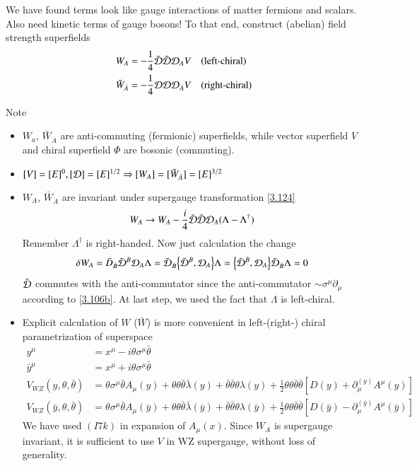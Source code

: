 We have found terms look like gauge interactions of matter fermions and scalars. Also need kinetic terms of gauge bosons! To that end, construct (abelian) field strength superfields
\begin{subequations}
\begin{align}
   W_A &= -\frac{1}{4} \bar{\mathcal{D}} \bar{\mathcal{D}} \mathcal{D}_A V \quad (\text{left-chiral}) \label{3.130a} \\
   \bar W_{\dot{A}} &= - \frac{1}{4} \mathcal{D} \mathcal{D} \mathcal{D}_{\dot{A}} V \quad (\text{right-chiral}) \label{3.130b}
\end{align}
\end{subequations}

Note 
\begin{itemize}
   \item $W_a$, $\bar W_{\dot{A}}$ are anti-commuting (fermionic) superfields, while vector superfield $V$ and chiral superfield $\Phi$ are bosonic (commuting).
   \item $[V] = [E]^0, [\mathcal{D}] = [E]^{1/2} \Rightarrow [W_A] = [\bar W_{\dot{A}}] = [E]^{3/2}$
   \item $W_A$, $\bar W_{\dot{A}}$ are invariant under supergauge transformation \eqref{3.124}
\begin{equation*}
   W_A \rightarrow W_A - \frac{i}{4} \bar{\mathcal{D}} \bar{\mathcal{D}} \mathcal{D}_A (\Lambda - \Lambda^\dagger)
\end{equation*}
Remember $\Lambda^\dagger$ is right-handed. Now just calculation the change
\begin{equation*}
   \delta W_A = \bar D_{\dot{B}} \bar\D^{\dot{B}} \D_A \Lambda = \bar\D_{\dot{B}} \acomm{\bar\D^{\dot{B}}}{\D_A} \Lambda = \acomm{\bar\D^{\dot{B}}}{\D_A} \bar\D_{\dot{B}} \Lambda = 0
\end{equation*}
$\bar{\mathcal{D}}$ commutes with the anti-commutator since the anti-commutator $\sim \sigma^\mu \partial_\mu $ according to \eqref{3.106b}. At last step, we used the fact that $\Lambda$ is left-chiral.

\item Explicit calculation of $W$ ($\bar W$) is more convenient in left-(right-) chiral parametrization of superspace
   \begin{align*}
      y^\mu &= x^\mu - i \theta \sigma^\mu \bar\theta \\
      \bar y^\mu &= x^\mu + i \theta \sigma^\mu \bar\theta \\
      V_{WZ}(y, \theta, \bar\theta) &= \theta \sigma^\mu \bar\theta A_\mu(y) + \theta\theta \bar\theta \bar\lambda(y) + \bar\theta \bar\theta \theta \lambda(y) + \frac{1}{2} \theta \theta \bar\theta \bar\theta \left[ D(y) + \partial_\mu^{(y)} A^\mu (y) \right] \\
      V_{WZ}(\bar y, \theta, \bar\theta) &= \theta \sigma^\mu \bar\theta A_\mu(\bar y) + \theta\theta \bar\theta \bar\lambda( \bar y) + \bar\theta \bar\theta \theta \lambda(\bar y) + \frac{1}{2} \theta \theta \bar\theta \bar\theta \left[ D(\bar y) - \partial_\mu^{(\bar y)} A^\mu (\bar y) \right]
   \end{align*}
   We have used $(I7k)$ in expansion of $A_\mu (x)$. Since $W_A$ is supergauge invariant, it is sufficient to use $V$ in WZ supergauge, without loss of generality.
\end{itemize}


